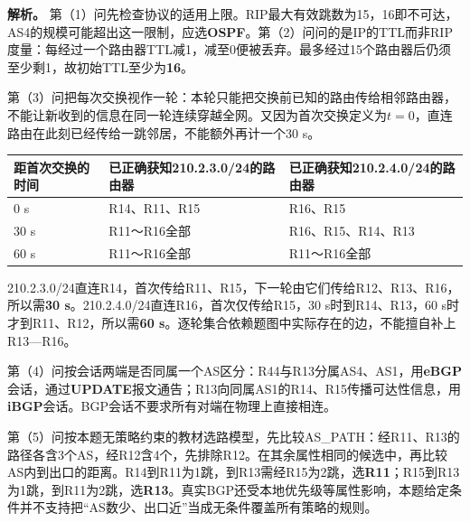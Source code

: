\textbf{解析。} 第（1）问先检查协议的适用上限。RIP最大有效跳数为15，16即不可达，AS4的规模可能超出这一限制，应选\textbf{OSPF}。第（2）问问的是IP的TTL而非RIP度量：每经过一个路由器TTL减1，减至0便被丢弃。最多经过15个路由器后仍须至少剩1，故初始TTL至少为\textbf{16}。

第（3）问把每次交换视作一轮：本轮只能把交换前已知的路由传给相邻路由器，不能让新收到的信息在同一轮连续穿越全网。又因为首次交换定义为\(t=0\)，直连路由在此刻已经传给一跳邻居，不能额外再计一个30 s。

\begin{wideblock}

\par\medskip\noindent\begin{minipage}{\linewidth}\fontsize{9.3}{12}\selectfont\begin{tabularx}{\linewidth}{@{}YYY@{}}
\toprule\noalign{}
\begin{minipage}[b]{\linewidth}\raggedright
距首次交换的时间
\end{minipage} & \begin{minipage}[b]{\linewidth}\raggedright
已正确获知210.2.3.0/24的路由器
\end{minipage} & \begin{minipage}[b]{\linewidth}\raggedright
已正确获知210.2.4.0/24的路由器
\end{minipage} \\
\midrule\noalign{}


0 s & R14、R11、R15 & R16、R15 \\
30 s & R11～R16全部 & R16、R15、R14、R13 \\
60 s & R11～R16全部 & R11～R16全部 \\
\bottomrule\end{tabularx}
\end{minipage}\par\medskip

\end{wideblock}

210.2.3.0/24直连R14，首次传给R11、R15，下一轮由它们传给R12、R13、R16，所以需\textbf{30 s}。210.2.4.0/24直连R16，首次仅传给R15，30 s时到R14、R13，60 s时才到R11、R12，所以需\textbf{60 s}。逐轮集合依赖题图中实际存在的边，不能擅自补上R13---R16。

第（4）问按会话两端是否同属一个AS区分：R44与R13分属AS4、AS1，用\textbf{eBGP}会话，通过\textbf{UPDATE}报文通告；R13向同属AS1的R14、R15传播可达性信息，用\textbf{iBGP}会话。BGP会话不要求所有对端在物理上直接相连。

第（5）问按本题无策略约束的教材选路模型，先比较AS\_PATH：经R11、R13的路径各含3个AS，经R12含4个，先排除R12。在其余属性相同的候选中，再比较AS内到出口的距离。R14到R11为1跳，到R13需经R15为2跳，选\textbf{R11}；R15到R13为1跳，到R11为2跳，选\textbf{R13}。真实BGP还受本地优先级等属性影响，本题给定条件并不支持把``AS数少、出口近''当成无条件覆盖所有策略的规则。

